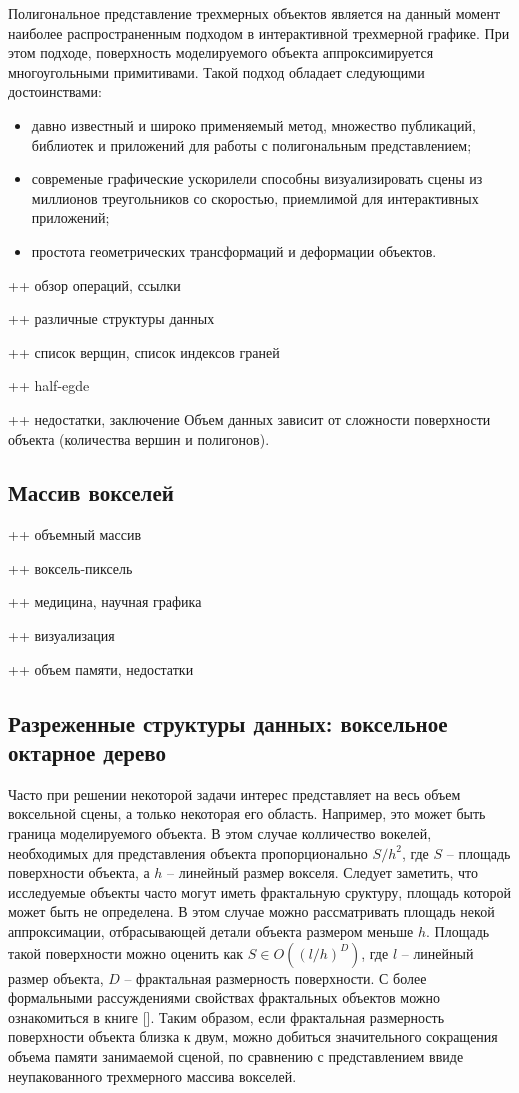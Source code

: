 \documentclass[a4paper,14pt]{extreport}
\begin{document}
Полигональное представление трехмерных объектов является на данный момент наиболее распространенным подходом в интерактивной трехмерной графике. При этом подходе, поверхность моделируемого объекта аппроксимируется многоугольными примитивами. Такой подход обладает следующими достоинствами:

\begin{itemize}
\item давно известный и широко применяемый метод, множество публикаций, библиотек и приложений для работы с полигональным представлением;
\item современые графические ускорилели способны визуализировать сцены из миллионов треугольников со скоростью, приемлимой для интерактивных приложений;
\item простота геометрических трансформаций и деформации объектов.
\end{itemize}

++ обзор операций, ссылки

++ различные структуры данных

++ список верщин, список индексов граней

++ half-egde

++ недостатки, заключение
Объем данных зависит от сложности поверхности объекта (количества вершин и полигонов).

\subsection{Массив вокселей}

++ объемный массив

++ воксель-пиксель

++ медицина, научная графика

++ визуализация

++ объем памяти, недостатки

\subsection{Разреженные структуры данных: воксельное октарное дерево}

Часто при решении некоторой задачи интерес представляет на весь объем воксельной сцены, а только некоторая его область. Например, это может быть граница моделируемого объекта. В этом случае колличество вокелей, необходимых для представления объекта пропорционально $S/h^2$, где $S$ -- площадь поверхности объекта, а $h$ -- линейный размер вокселя. Следует заметить, что исследуемые объекты часто могут иметь фрактальную сруктуру, площадь которой может быть не определена. В этом случае можно рассматривать площадь некой аппроксимации, отбрасывающей детали объекта размером меньше $h$. Площадь такой поверхности можно оценить как $S \in O((l/ h)^D)$, где $l$ -- линейный размер объекта, $D$ -- фрактальная размерность поверхности. С более формальными рассуждениями свойствах фрактальных объектов можно ознакомиться в книге [].
Таким образом, если фрактальная размерность поверхности объекта близка к двум, можно добиться значительного сокращения объема памяти занимаемой сценой, по сравнению с представлением ввиде неупакованного трехмерного массива вокселей.
\end{document}
